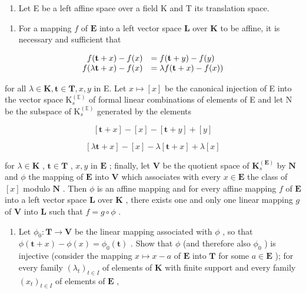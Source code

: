 \begin{enumerate}
\def\labelenumi{\arabic{enumi}.}
\setcounter{enumi}{7}
\tightlist
\item
  Let E be a left affine space over a field K and T its translation space.
\end{enumerate}

\begin{enumerate}
\def\labelenumi{(\alph{enumi})}
\tightlist
\item
  For a mapping \(f\) of \(\mathbf{E}\) into a left vector space \(\mathbf{L}\) over \(\mathbf{K}\) to be affine, it is necessary and sufficient that
\end{enumerate}

\[
\begin{array}{r l} f (\mathbf {t} + x) - f (x) & = f (\mathbf {t} + y) - f (y) \\ f (\lambda \mathbf {t} + x) - f (x) & = \lambda f (\mathbf {t} + x) - f (x)) \end{array}
\]

for all \(\lambda\in\mathbf{K},\mathbf{t}\in\mathbf{T},x,y\) in E. Let \(x\mapsto[x]\) be the canonical injection of E into the vector space \(\mathrm{K}_{s}^{(\mathbb{E})}\) of formal linear combinations of elements of E and let N be the subspace of \(\mathrm{K}_{s}^{(\mathbb{E})}\) generated by the elements

\[
[ \mathbf {t} + x ] - [ x ] - [ \mathbf {t} + y ] + [ y ]
\]

\[
[ \lambda \mathbf {t} + x ] - [ x ] - \lambda [ \mathbf {t} + x ] + \lambda [ x ]
\]

for \(\lambda \in \mathbf{K}\) , \(\mathbf{t} \in \mathbf{T}\) , \(x, y\) in \(\mathbf{E}\) ; finally, let \(\mathbf{V}\) be the quotient space of \(\mathbf{K}_s^{(\mathbf{E})}\) by \(\mathbf{N}\) and \(\phi\) the mapping of \(\mathbf{E}\) into \(\mathbf{V}\) which associates with every \(x \in \mathbf{E}\) the class of \([x]\) modulo \(\mathbf{N}\) . Then \(\phi\) is an affine mapping and for every affine mapping \(f\) of \(\mathbf{E}\) into a left vector space \(\mathbf{L}\) over \(\mathbf{K}\) , there exists one and only one linear mapping \(g\) of \(\mathbf{V}\) into \(\mathbf{L}\) such that \(f = g \circ \phi\) .

\begin{enumerate}
\def\labelenumi{(\alph{enumi})}
\setcounter{enumi}{1}
\tightlist
\item
  Let \(\phi_0: \mathbf{T} \to \mathbf{V}\) be the linear mapping associated with \(\phi\) , so that \(\phi(\mathbf{t} + x) - \phi(x) = \phi_0(\mathbf{t})\) . Show that \(\phi\) (and therefore also \(\phi_0\) ) is injective (consider the mapping \(x \mapsto x - a\) of \(\mathbf{E}\) into \(\mathbf{T}\) for some \(a \in \mathbf{E}\) ); for every family \((\lambda_t)_{t \in I}\) of elements of \(\mathbf{K}\) with finite support and every family \((x_t)_{t \in I}\) of elements of \(\mathbf{E}\) ,
\end{enumerate}

